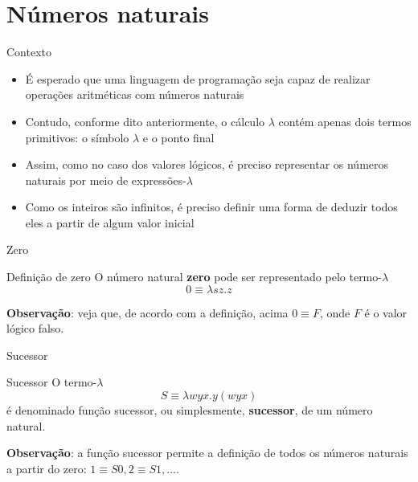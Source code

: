 \section{Números naturais}

\begin{frame}[fragile]{Contexto}

    \begin{itemize}
        \item É esperado que uma linguagem de programação seja capaz de realizar operações
            aritméticas com números naturais

        \item Contudo, conforme dito anteriormente, o cálculo $\lambda$ contém apenas dois
            termos primitivos: o símbolo $\lambda$ e o ponto final

        \item Assim, como no caso dos valores lógicos, é preciso representar os números naturais
            por meio de expressões-$\lambda$

        \item Como os inteiros são infinitos, é preciso definir uma forma de deduzir todos eles
            a partir de algum valor inicial
    \end{itemize}

\end{frame}

\begin{frame}[fragile]{Zero}

    \begin{block}{Definição de zero}
        O número natural \textbf{zero} pode ser representado pelo termo-$\lambda$
        \[
            0 \equiv \lambda sz.z
        \]
    \end{block}

    \vspace{0.1in}

    \textbf{Observação}: veja que, de acordo com a definição, acima $0 \equiv F$, onde $F$ é o
        valor lógico falso.
\end{frame}

\begin{frame}[fragile]{Sucessor}

    \begin{block}{Sucessor}
        O termo-$\lambda$
        \[
            S \equiv \lambda wyx.y(wyx)
        \]
        é denominado função sucessor, ou simplesmente, \textbf{sucessor}, de um número
        natural.
    \end{block}

    \vspace{0.2in}

    \textbf{Observação}: a função sucessor permite a definição de todos os números naturais 
        a partir do zero: $1\equiv S0, 2\equiv S1, \ldots$.
\end{frame}

